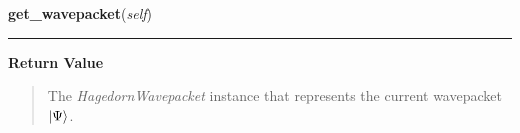    \label{HagedornPropagator:HagedornPropagator:get_wavepacket}

    \vspace{0.5ex}

\hspace{.8\funcindent}\begin{boxedminipage}{\funcwidth}

    \raggedright \textbf{get\_wavepacket}(\textit{self})

    \vspace{-1.5ex}

    \rule{\textwidth}{0.5\fboxrule}
\setlength{\parskip}{2ex}
\setlength{\parskip}{1ex}
      \textbf{Return Value}
    \vspace{-1ex}

      \begin{quote}
      The \textit{HagedornWavepacket} instance that represents the current
      wavepacket $\Ket{\Psi}$.

      \end{quote}

    \end{boxedminipage}

    \vspace{0.5ex}

